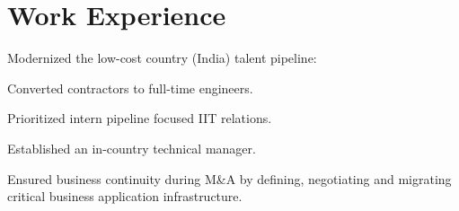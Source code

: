 \section{Work Experience}


\vspace{\topsep} %
\begin{tightemize}
	\item Modernized the low-cost country (India) talent pipeline:
	\vspace{.5\topsep} %
	\begin{tightemize}
		\item Converted contractors to full-time engineers.
		\item Prioritized intern pipeline focused IIT relations.
		\item Established an in-country technical manager.
	\end{tightemize}
	\vspace{.5\topsep} %
	\item Ensured business continuity during M\&A by defining, negotiating and migrating critical business application infrastructure.
\end{tightemize}
\sectionsep


